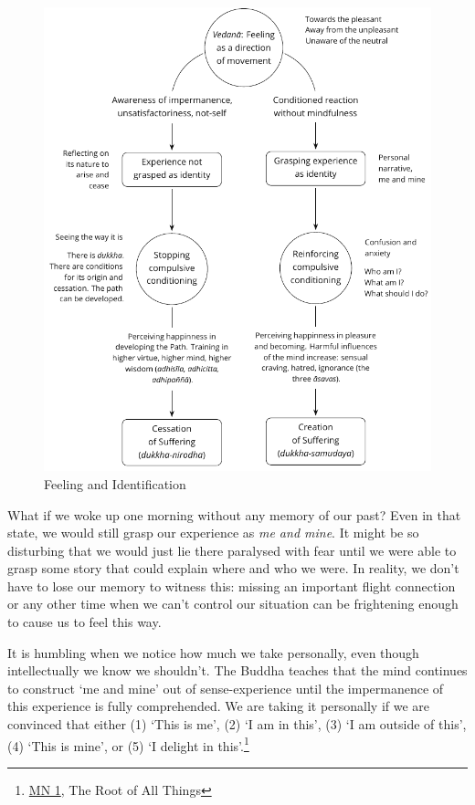 \begin{figure}[h]
\caption{Feeling and Identification}\label{fig-feeling-identification}
\bigskip
\includegraphics[width=\linewidth]{./manuscript/tex/diagrams/feeling-identification.pdf}
\end{figure}

\clearpage
\normalpagelayout

What if we woke up one morning without any memory of our past? Even in
that state, we would still grasp our experience as \emph{me and mine}.
It might be so disturbing that we would just lie there paralysed with
fear until we were able to grasp some story that could explain where and
who we were. In reality, we don't have to lose our memory to witness
this: missing an important flight connection or any other time when we
can't control our situation can be frightening enough to cause us to
feel this way.

It is humbling when we notice how much we take personally, even though
intellectually we know we shouldn't. The Buddha teaches that the mind
continues to construct `me and mine' out of sense-experience until the
impermanence of this experience is fully comprehended. We are taking it
personally if we are convinced that either (1) `This is me', (2) `I am
in this', (3) `I am outside of this', (4) `This is mine', or (5) `I
delight in this'.\footnote{\href{https://suttacentral.net/mn1/en/bodhi}{MN
  1}, The Root of All Things}

